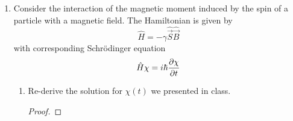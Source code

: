 \documentclass[../psets.tex]{subfiles}
\begin{document}
\begin{enumerate}
\begin{enumerate}
\begin{proof}
\begin{align*}
                1-\sin^2(\theta_s)\cdot 1+\sin^4(\theta_s)\cos^2(\alpha-\beta)\sin^2(\alpha-\beta) &\stackrel{?}{\geq} \cos^2(\theta_s)\\
                [1-\sin^2(\theta_s)]+\sin^4(\theta_s)\cos^2(\alpha-\beta)\sin^2(\alpha-\beta) &\stackrel{?}{\geq} \cos^2(\theta_s)\\
                \cos^2(\theta_s)+\sin^4(\theta_s)\cos^2(\alpha-\beta)\sin^2(\alpha-\beta) &\stackrel{?}{\geq} \cos^2(\theta_s)\\
                \sin^4(\theta_s)\cos^2(\alpha-\beta)\sin^2(\alpha-\beta) &\stackrel{?}{\geq} 0\\
                [\sin^2(\theta_s)\cos(\alpha-\beta)\sin(\alpha-\beta)]^2 &\stackrel{\checkmark}{\geq} 0
            \end{align*}
        \end{proof}
        \item What are the results of part (d) if you take an eigenstate of $\hat{S}_z$ with eigenvalue $\hbar/2$ ($\theta_s=\alpha=0$)?
        \begin{proof}
            Using the coordinate changes in the hint for part (e), we know that $\theta_s=\alpha=0$ implies that
            \begin{align*}
                c_+ &= \cos(\frac{0}{2})\e[i\cdot 0] = 1&
                c_- &= \sin(\frac{0}{2})\e[i\cdot\beta] = 0
            \end{align*}
            Thus, substituting into the results from part (d) and algebraically simplifying, we obtain
            \begin{align*}
                \Aboxed{\ev{\hat{S}_z}{\chi} &= \frac{\hbar}{2}}&
                \Aboxed{\ev{\hat{S}_x}{\chi} &= 0}&
                \Aboxed{\ev{\hat{S}_y}{\chi} &= 0}
            \end{align*}
        \end{proof}
    \end{enumerate}
    \item Consider the interaction of the magnetic moment induced by the spin of a particle with a magnetic field. The Hamiltonian is given by
    \begin{equation}
        \hat{H} = -\gamma\hat{\vec{S}}\hat{\vec{B}}
    \end{equation}
    with corresponding Schr\"{o}dinger equation
    \begin{equation}
        \hat{H}\chi = i\hbar\pdv{\chi}{t}
    \end{equation}
    \begin{enumerate}
        \item Re-derive the solution for $\chi(t)$ we presented in class.
        \begin{proof}
            

\end{proof}
\end{enumerate}
\end{enumerate}
\end{document}
